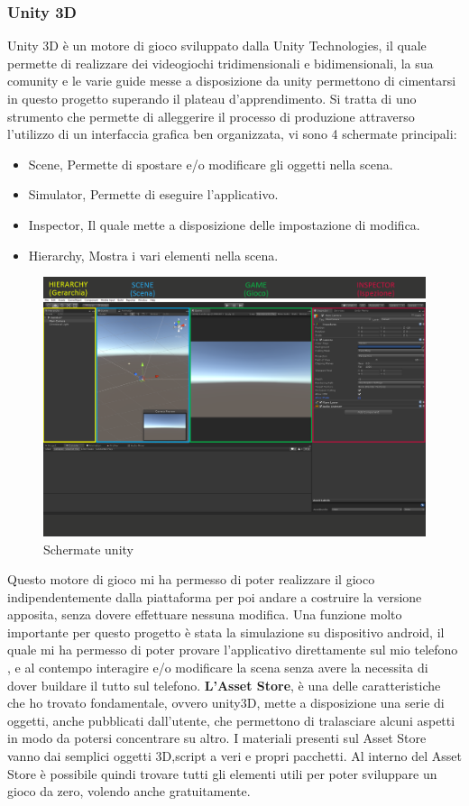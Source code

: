 \documentclass[
a4paper,
cleardoublepage=empty,
headings=twolinechapter,
numbers=autoenddot,
]{scrbook}
\begin{document}
    \subsubsection{Unity 3D}\label{unity3D}
    Unity 3D è un motore di gioco sviluppato dalla Unity
    Technologies, il quale permette di realizzare dei videogiochi tridimensionali e bidimensionali, la sua comunity e le varie guide messe a disposizione da unity permettono di cimentarsi in questo progetto superando il plateau d'apprendimento.
    Si tratta di uno strumento che permette di alleggerire il processo di produzione attraverso l'utilizzo di un interfaccia grafica ben organizzata, vi sono 4 schermate principali:
    \begin{itemize}
    	\item Scene, Permette di spostare e/o modificare gli oggetti nella scena.
    	\item Simulator, Permette di eseguire l'applicativo.
    	\item Inspector, Il quale mette a disposizione delle impostazione di modifica.
    	\item Hierarchy, Mostra i vari elementi nella scena.
    \end{itemize}
    \begin{figure}[H]
    	\centering
    	\includegraphics[width=0.8\linewidth]{image/unity}
    	\caption{Schermate unity}
    	\label{fig:unity}
    \end{figure}
    Questo motore di gioco mi ha permesso  di poter realizzare il gioco indipendentemente dalla piattaforma per poi andare a costruire la versione apposita, senza dovere effettuare nessuna modifica.
    Una funzione molto importante per questo progetto è stata la simulazione su dispositivo android, il quale mi ha permesso di poter provare l'applicativo direttamente sul mio telefono , e al contempo interagire e/o modificare la scena senza avere la necessita di dover buildare il tutto sul telefono.
    \textbf{L'Asset Store}, è una delle caratteristiche che ho trovato fondamentale, ovvero unity3D, mette a disposizione una serie di oggetti, anche pubblicati dall'utente, che permettono di tralasciare alcuni aspetti in modo da potersi concentrare su altro.
    I materiali presenti sul Asset Store vanno dai semplici oggetti 3D,script a veri e propri pacchetti.
    Al interno del Asset Store è possibile quindi trovare tutti gli elementi utili per poter sviluppare un gioco da zero, volendo anche gratuitamente.
\end{document}
